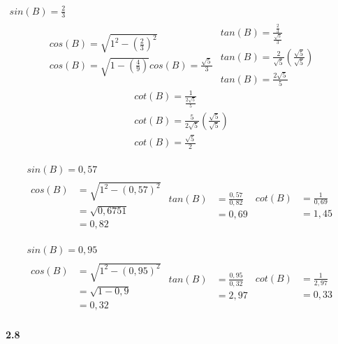  \begin{gather}
   sin(B) = \frac{2}{3} \\
   \begin{align}
     cos(B) = \sqrt{1^2 - (\frac{2}{3})^2} \\
     cos(B) = \sqrt{1 - (\frac{4}{9})}
     cos(B) = \frac{\sqrt{5}}{3}
   \end{align}
   \begin{align}
     tan(B) = \frac{\frac{2}{3}}{\frac{\sqrt{5}}{3}} \\
     tan(B) = \frac{2}{\sqrt{5}} \left( \frac{\sqrt{5}}{\sqrt{5}} \right) \\
     tan(B) = \frac{2 \sqrt{5}}{5} 
   \end{align}
   \begin{align}
    cot(B) = \frac{1}{\frac{2 \sqrt{5}}{5}} \\
    cot(B) = \frac{5}{2 \sqrt{5}} \left( \frac{\sqrt{5}}{\sqrt{5}} \right) \\
    cot(B) = \frac{\sqrt{5}}{2} 
   \end{align}
 \end{gather}

 \begin{gather}
   sin(B) = 0,57 \\
  \begin{align}
    cos(B) &= \sqrt{1^2 - (0,57)^2} \\
           &= \sqrt{0,6751} \\
           &= 0,82
  \end{align}
  \begin{align}
    tan(B) &= \frac{0,57}{0,82} \\
           &= 0,69
  \end{align}
  \begin{align}
    cot(B) &= \frac{1}{0,69} \\
           &= 1,45
  \end{align}
 \end{gather}

 \begin{gather}
  sin(B) = 0,95 \\
  \begin{align}
    cos(B) &= \sqrt{1^2 - (0,95)^2} \\
           &= \sqrt{1 - 0,9} \\
           &= 0,32
  \end{align}
  \begin{align}
    tan(B) &= \frac{0,95}{0,32} \\
           &= 2,97 
  \end{align}
  \begin{align}
    cot(B) &= \frac{1}{2,97} \\
           &= 0,33
  \end{align}
 \end{gather}

 \paragraph{2.8}



